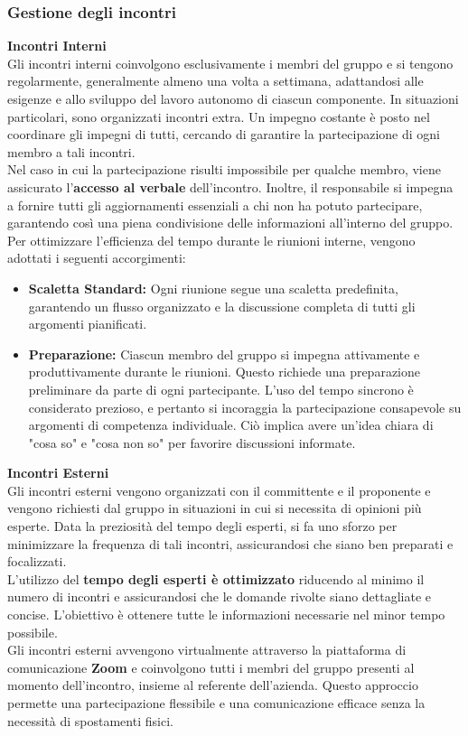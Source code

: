 \documentclass{article}
\begin{document}
\subsubsection{Gestione degli incontri}
\textbf{Incontri Interni}\\
Gli incontri interni coinvolgono esclusivamente i membri del gruppo e si tengono regolarmente, generalmente almeno una volta a settimana, adattandosi alle esigenze e allo sviluppo del lavoro autonomo di ciascun componente. In situazioni particolari, sono organizzati incontri extra. Un impegno costante è posto nel coordinare gli impegni di tutti, cercando di garantire la partecipazione di ogni membro a tali incontri.\\
Nel caso in cui la partecipazione risulti impossibile per qualche membro, viene assicurato l'\textbf{accesso al verbale} dell'incontro. Inoltre, il responsabile si impegna a fornire tutti gli aggiornamenti essenziali a chi non ha potuto partecipare, garantendo così una piena condivisione delle informazioni all'interno del gruppo.\\
Per ottimizzare l'efficienza del tempo durante le riunioni interne, vengono adottati i seguenti accorgimenti:
\begin{itemize}
    \item \textbf{Scaletta Standard:} Ogni riunione segue una scaletta predefinita, garantendo un flusso organizzato e la discussione completa di tutti gli argomenti pianificati.
    \item \textbf{Preparazione:} Ciascun membro del gruppo si impegna attivamente e produttivamente durante le riunioni. Questo richiede una preparazione preliminare da parte di ogni partecipante. L'uso del tempo sincrono è considerato prezioso, e pertanto si incoraggia la partecipazione consapevole su argomenti di competenza individuale. Ciò implica avere un'idea chiara di "cosa so" e "cosa non so" per favorire discussioni informate.
\end{itemize}
\textbf{Incontri Esterni}\\
Gli incontri esterni vengono organizzati con il committente e il proponente e vengono richiesti dal gruppo in situazioni in cui si necessita di opinioni più esperte. Data la preziosità del tempo degli esperti, si fa uno sforzo per minimizzare la frequenza di tali incontri, assicurandosi che siano ben preparati e focalizzati.\\ 
L'utilizzo del \textbf{tempo degli esperti è ottimizzato} riducendo al minimo il numero di incontri e assicurandosi che le domande rivolte siano dettagliate e concise. L'obiettivo è ottenere tutte le informazioni necessarie nel minor tempo possibile.\\
Gli incontri esterni avvengono virtualmente attraverso la piattaforma di comunicazione \textbf{Zoom} e coinvolgono tutti i membri del gruppo presenti al momento dell'incontro, insieme al referente dell'azienda. Questo approccio permette una partecipazione flessibile e una comunicazione efficace senza la necessità di spostamenti fisici.\\\\
\end{document}
